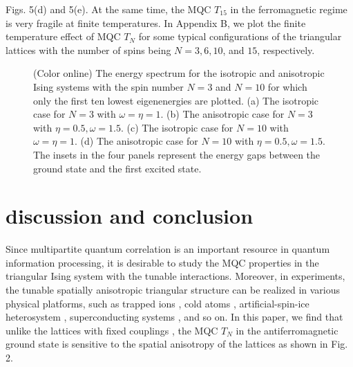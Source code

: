 \documentclass[pra,aps,twocolumn,showpacs]{revtex4}
\begin{document}
Figs. 5(d) and 5(e). At the same time, the MQC $T_{15}$ in the ferromagnetic regime is very fragile at finite temperatures.
In Appendix B, we plot the finite temperature effect of MQC $T_N$ for some typical configurations of the triangular lattices with the number of spins being $N=3, 6, 10$, and $15$, respectively.

\begin{figure}
	\caption{(Color online) The energy spectrum for the isotropic and anisotropic Ising systems with the spin number $N=3$ and $N=10$ for which only the first ten lowest eigenenergies are plotted. (a) The isotropic case for $N=3$ with $\omega=\eta=1$. (b) The anisotropic case for $N=3$ with $\eta=0.5, \omega=1.5$. (c) The isotropic case for $N=10$ with $\omega=\eta=1$. (d) The anisotropic case for $N=10$ with $\eta=0.5, \omega=1.5$. The insets in the four panels represent the energy gaps between the ground state and the first excited state.}
\end{figure}


\section{discussion and conclusion}

Since multipartite quantum correlation is an important resource in quantum information processing, it is desirable to study the MQC properties in the triangular Ising system with the tunable interactions. Moreover, in experiments, the tunable spatially anisotropic triangular structure can be realized in various physical platforms, such as trapped ions \cite{kim10nat}, cold atoms \cite{Struck11sci}, artificial-spin-ice heterosystem \cite{wang18natnano}, superconducting systems \cite{niskanen07sci}, and so on. In this paper, we find that unlike the lattices with fixed couplings \cite{rkrao13pra}, the MQC $T_N$ in the antiferromagnetic ground state is sensitive to the spatial anisotropy of the lattices as shown in Fig. 2.
\end{document}

